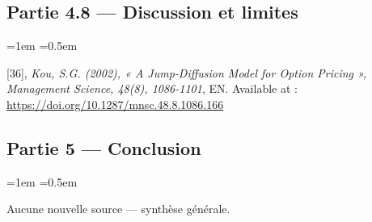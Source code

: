 \documentclass{article}
\begin{document}
\subsection*{Partie 4.8 --- Discussion et limites}
\begin{list}{}{\leftmargin=1em \itemsep=0.5em}
\item \hypertarget{ref36}{} [36], \textit{Kou, S.G. (2002), « A Jump-Diffusion Model for Option Pricing », Management Science, 48(8), 1086-1101}, EN. Available at : \url{https://doi.org/10.1287/mnsc.48.8.1086.166}
\end{list}
\subsection*{Partie 5 --- Conclusion}
\begin{list}{}{\leftmargin=1em \itemsep=0.5em}
\item Aucune nouvelle source --- synthèse générale.
\end{list}
\end{document}
